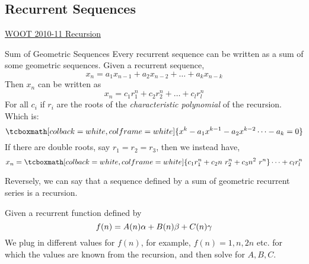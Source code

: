 \newpage \subsection{Recurrent Sequences}	
	
	
	\begin{myitemize}
		\item \href{https://ufile.io/ywbniil2}{WOOT 2010-11 Recursion}
	\end{myitemize}
	
	
	\begin{BoxedTheorem}{Sum of Geometric Sequences}{}\label{theorem:Sum of Geometric Sequences}
		Every recurrent sequence can be written as a sum of some geometric sequences. Given a recurrent sequence, 
		\[x_n = a_1x_{n-1} + a_2x_{n-2}	+\dots + a_kx_{n-k}\]
		Then $ x_n $ can be written as 
		\[x_n = c_1r_1^n + c_2r_2^n +\dots + c_lr_l^n\]
		For all $ c_i $ if $ r_i $ are the roots of the \emph{characteristic polynomial} of the recursion. Which is:
		\[\tcboxmath[colback=white, colframe=white]{x^k - a_1x^{k-1} - a_2x^{k-2} \dots - a_k = 0}\]
		If there are double roots, say $ r_1 = r_2 = r_3 $, then we instead have,
		\[x_n = \tcboxmath[colback=white, colframe=white]{c_1r_1^n + c_2n\ r_2^n + c_3n^2\ r^n} \dots + c_lr_l^n\]
		 
		Reversely, we can say that a sequence defined by a sum of geometric recurrent series is a recursion. 
	\end{BoxedTheorem}

	
	
	\begin{BoxedTheorem}[title=Repertoire Method]{}{}
		Given a recurrent function defined by 
		\[f(n) = A(n)\alpha + B(n)\beta + C(n)\gamma\]
		We plug in different values for $ f(n) $, for example, $ f(n) = 1, n, 2n $ etc. for which the values are known from the recursion, and then solve for $ A, B, C $.
	\end{BoxedTheorem}